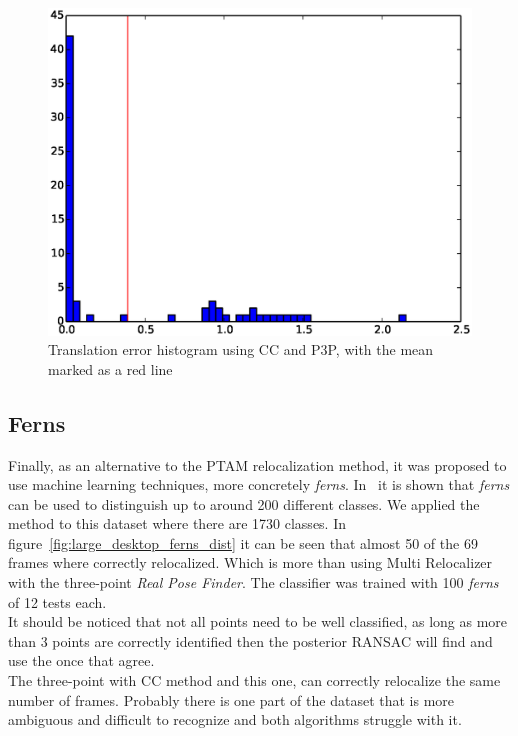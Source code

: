\begin{figure}[htpb]
          \includegraphics[width=1\linewidth]{img/large_desktop/CC_3pt_dist.eps}
          \caption{Translation error histogram using CC and P3P, with the mean marked as a red line}                
          \label{fig:desktop_2_CC_3pt_dist_1}
\end{figure}


\subsection{Ferns}
\label{sub:large_ferns}

Finally, as an alternative to the PTAM relocalization method, it was proposed to use machine learning techniques, more concretely \textit{ferns}. In~\cite{Ozuysal2010} it is shown that \textit{ferns} can be used to distinguish up to around 200 different classes. We applied the method to this dataset where there are 1730 classes. In figure~\ref{fig:large_desktop_ferns_dist} it can be seen that almost 50 of the 69 frames where correctly relocalized. Which is more than using Multi Relocalizer with the three-point \textit{Real Pose Finder}. The classifier was trained with 100 \textit{ferns} of 12 tests each.\\

It should be noticed that not all points need to be well classified, as long as more than 3 points are correctly identified then the posterior RANSAC will find and use the once that agree.\\

The three-point with CC method and this one, can correctly relocalize the same number of frames. Probably there is one part of the dataset that is more ambiguous and difficult to recognize and both algorithms struggle with it.\\

